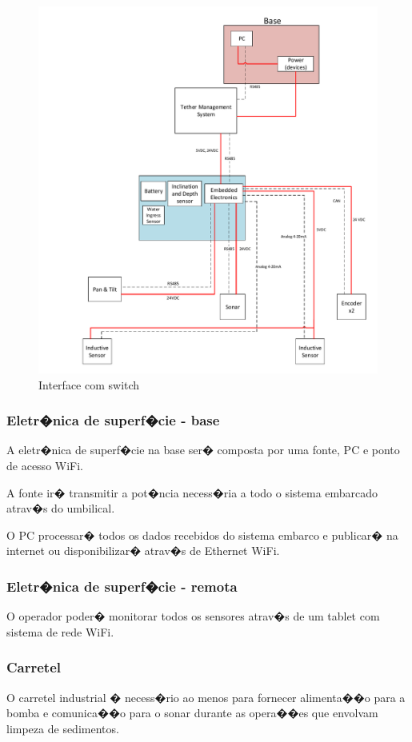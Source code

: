\begin{figure}[H]
    \centering
    \includegraphics[width=1\columnwidth]{figs/EE/2.pdf}
    \caption{Interface com switch}
    \label{EE_2}
\end{figure}

\subsubsection{Eletr�nica de superf�cie - base}
A eletr�nica de superf�cie na base ser� composta por uma fonte, PC e ponto de
acesso WiFi.

A fonte ir� transmitir a pot�ncia necess�ria a todo o sistema embarcado atrav�s
do umbilical.

O PC processar� todos os dados recebidos do sistema embarco e publicar� na
internet ou disponibilizar� atrav�s de Ethernet WiFi.

\subsubsection{Eletr�nica de superf�cie - remota}
O operador poder� monitorar todos os sensores atrav�s de um tablet com sistema
de rede WiFi.

\subsubsection{Carretel}
O carretel industrial � necess�rio ao menos para fornecer alimenta��o para a bomba e comunica��o para o sonar durante as opera��es que envolvam limpeza de sedimentos.
 
